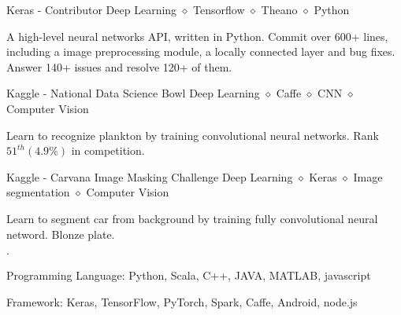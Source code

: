 \documentclass{joel_cv}
\begin{document}
%
%


\begin{proj}{Keras - Contributor}
    {Deep Learning $\diamond$ Tensorflow $\diamond$ Theano $\diamond$ Python}
    \item A high-level neural networks API, written in Python. Commit over 600+ lines, including a image preprocessing module, a locally connected layer and bug fixes. Answer 140+ issues and resolve 120+ of them.
\end{proj}

\begin{proj}{Kaggle - National Data Science Bowl}
    {Deep Learning $\diamond$ Caffe $\diamond$ CNN $\diamond$ Computer Vision}
    \item Learn to recognize plankton by training convolutional neural networks. Rank $51^{th} (4.9\%)$ in competition.
\end{proj}

\begin{proj}{Kaggle - Carvana Image Masking Challenge}
    {Deep Learning $\diamond$ Keras $\diamond$ Image segmentation $\diamond$ Computer Vision}
    \item Learn to segment car from background by training fully convolutional neural netword. Blonze plate.
\end{proj}

%
%

\begin{sectionItemize}{$\cdot$}
    \item Programming Language: Python, Scala, C++, JAVA, MATLAB, javascript
    \item Framework: Keras, TensorFlow, PyTorch, Spark, Caffe, Android, node.js
\end{sectionItemize}
\end{document}
